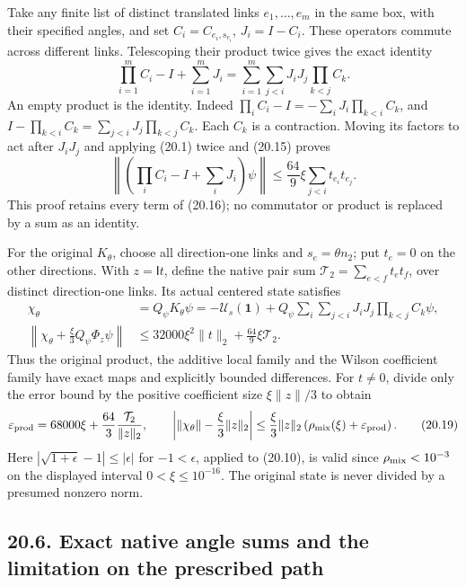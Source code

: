 \documentclass[
]{article}
\begin{document}
Take any finite list of distinct translated links \(e_1,\ldots,e_m\) in
the same box, with their specified angles, and set
\(C_i=C_{e_i,s_{e_i}}\), \(J_i=I-C_i\). These operators commute across
different links. Telescoping their product twice gives the exact
identity \[
\prod_{i=1}^m C_i-I+\sum_{i=1}^mJ_i
 =\sum_{i=1}^m\sum_{j<i}J_iJ_j\prod_{k<j}C_k .
                                                               \tag{20.16}
\] An empty product is the identity. Indeed
\(\prod_iC_i-I=-\sum_iJ_i\prod_{k<i}C_k\), and
\(I-\prod_{k<i}C_k=\sum_{j<i}J_j\prod_{k<j}C_k\). Each \(C_k\) is a
contraction. Moving its factors to act after \(J_iJ_j\) and applying
(20.1) twice and (20.15) proves \[
\left\|\left(\prod_iC_i-I+\sum_iJ_i\right)\psi\right\|
 \le\frac{64}{9}\xi\sum_{j<i}t_{e_i}t_{e_j}.
                                                               \tag{20.17}
\] This proof retains every term of (20.16); no commutator or product is
replaced by a sum as an identity.

For the original \(K_\theta\), choose all direction-one links and
\(s_e=\theta n_2\); put \(t_e=0\) on the other directions. With
\(z=\mathsf It\), define the native pair sum
\(\mathcal T_2=\sum_{e<f}t_et_f\), over distinct direction-one links.
Its actual centered state satisfies \[
\begin{aligned}
\chi_\theta&=Q_\psi K_\theta\psi
 =-\mathcal U_s(\mathbf1)+
 Q_\psi\sum_{i}\sum_{j<i}J_iJ_j\prod_{k<j}C_k\psi,\\
\left\|\chi_\theta+\frac{\xi}{3}Q_\psi\Phi_z\psi\right\|
 &\le32000\xi^2\|t\|_2+\frac{64}{9}\xi\mathcal T_2 .
\end{aligned}                                                   \tag{20.18}
\] Thus the original product, the additive local family and the Wilson
coefficient family have exact maps and explicitly bounded differences.
For \(t\ne0\), divide only the error bound by the positive coefficient
size \(\xi\|z\|/3\) to obtain \[
\varepsilon_{\rm prod}
 =68000\xi+\frac{64}{3}\frac{\mathcal T_2}{\|z\|_2},\qquad
\left|\|\chi_\theta\|-\frac{\xi}{3}\|z\|_2\right|
 \le\frac{\xi}{3}\|z\|_2
 \left(\rho_{\rm mix}(\xi)+\varepsilon_{\rm prod}\right).
                                                               \tag{20.19}
\] Here \(|\sqrt{1+\epsilon}-1|\le|\epsilon|\) for \(-1<\epsilon\),
applied to (20.10), is valid since \(\rho_{\rm mix}<10^{-3}\) on the
displayed interval \(0<\xi\le10^{-16}\). The original state is never
divided by a presumed nonzero norm.

\subsection{20.6. Exact native angle sums and the limitation on the
prescribed
path}\label{exact-native-angle-sums-and-the-limitation-on-the-prescribed-path}
\end{document}
